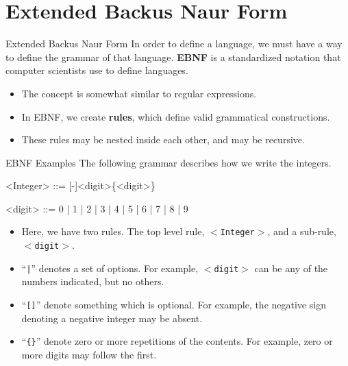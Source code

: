 \documentclass[11pt]{beamer}
\begin{document}
\section[EBNF]{Extended Backus Naur Form}
\begin{frame}[fragile=singleslide]{Extended Backus Naur Form}
In order to define a language, we must have a way to define the grammar of that language.  \textbf{EBNF} is a standardized notation that computer scientists use to define languages.  
\begin{itemize}
\item The concept is somewhat similar to regular expressions.
\item In EBNF, we create \textbf{rules}, which define valid grammatical constructions.
\item These rules may be nested inside each other, and may be recursive.  
\end{itemize}
\end{frame}

\begin{frame}[fragile=singleslide]{EBNF Examples}
The following grammar describes how we write the integers. \\
\dotfill
\begin{grammar}
<Integer> ::= [-]<digit>\{<digit>\}

<digit> ::= 0 | 1 | 2 | 3 | 4 | 5 | 6 | 7 | 8 | 9 
\end{grammar}
\dotfill
\begin{itemize}
\item Here, we have two rules.  The top level rule, \texttt{$<$Integer$>$}, and a sub-rule, \texttt{$<$digit$>$}.
\item ``\texttt{|}'' denotes a set of options.  For example, \texttt{$<$digit$>$} can be any of the numbers indicated, but no others.  
\item ``\texttt{[]}'' denote something which is optional.  For example, the negative sign denoting a negative integer may be absent. 
\item ``\texttt{\{\}}'' denote zero or more repetitions of the contents.  For example, zero or more digits may follow the first.
\end{itemize}
\end{frame}
\end{document}

